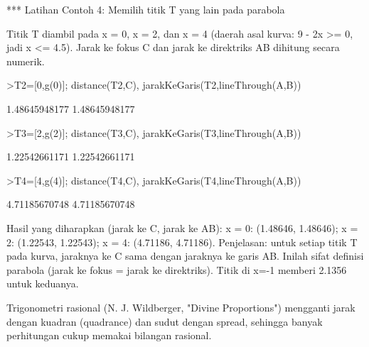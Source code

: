 \documentclass[a4paper,10pt]{article}
\begin{document}
\begin{eulernotebook}
\begin{eulercomment}
\begin{eulercomment}
\begin{eulercomment}
\begin{eulercomment}
\begin{eulercomment}
\begin{eulercomment}
\begin{eulercomment}
\begin{eulercomment}
\begin{eulercomment}
\begin{eulercomment}
\begin{eulercomment}
*** Latihan Contoh 4: Memilih titik T yang lain pada parabola

Titik T diambil pada x = 0, x = 2, dan x = 4 (daerah asal kurva: 9 - 2x \textgreater{}= 0, jadi x \textless{}= 4.5).
Jarak ke fokus C dan jarak ke direktriks AB dihitung secara numerik.
\end{eulercomment}
\begin{eulerprompt}
>T2=[0,g(0)]; distance(T2,C), jarakKeGaris(T2,lineThrough(A,B))
\end{eulerprompt}
\begin{euleroutput}
  1.48645948177
  1.48645948177
\end{euleroutput}
\begin{eulerprompt}
>T3=[2,g(2)]; distance(T3,C), jarakKeGaris(T3,lineThrough(A,B))
\end{eulerprompt}
\begin{euleroutput}
  1.22542661171
  1.22542661171
\end{euleroutput}
\begin{eulerprompt}
>T4=[4,g(4)]; distance(T4,C), jarakKeGaris(T4,lineThrough(A,B))
\end{eulerprompt}
\begin{euleroutput}
  4.71185670748
  4.71185670748
\end{euleroutput}
\begin{eulercomment}
Hasil yang diharapkan (jarak ke C, jarak ke AB):
x = 0: (1.48646, 1.48646); x = 2: (1.22543, 1.22543); x = 4: (4.71186, 4.71186).
Penjelasan: untuk setiap titik T pada kurva, jaraknya ke C sama dengan jaraknya ke garis AB.
Inilah sifat definisi parabola (jarak ke fokus = jarak ke direktriks). Titik di x=-1 memberi
2.1356 untuk keduanya.

\begin{eulercomment}
\begin{eulercomment}
\end{eulercomment}
\begin{eulercomment}
Trigonometri rasional (N. J. Wildberger, "Divine Proportions") mengganti jarak dengan kuadran
(quadrance) dan sudut dengan spread, sehingga banyak perhitungan cukup memakai bilangan
rasional.


\end{eulercomment}
\end{eulercomment}
\end{eulercomment}
\end{eulercomment}
\end{eulercomment}
\end{eulercomment}
\end{eulercomment}
\end{eulercomment}
\end{eulercomment}
\end{eulercomment}
\end{eulercomment}
\end{eulercomment}
\end{eulercomment}
\end{eulernotebook}
\end{document}
